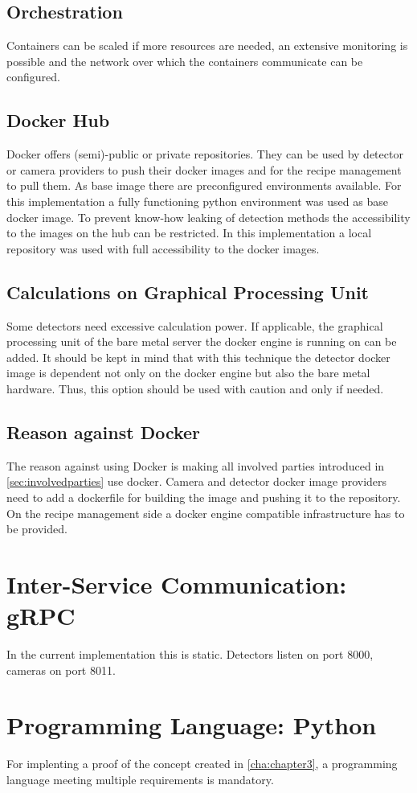 \subsection{Orchestration}
 Containers can be scaled if more resources are needed, an extensive monitoring is possible and the network over which the containers communicate can be configured. 
\subsection{Docker Hub}
 Docker offers (semi)-public or private repositories. They can be used by detector or camera providers to push their docker images and for the recipe management to pull them. As base image there are preconfigured environments available. For this implementation a fully functioning python environment was used as base docker image. To prevent know-how leaking of detection methods the accessibility to the images on the hub can be restricted. In this implementation a local repository was used with full accessibility to the docker images.
 \subsection{Calculations on Graphical Processing Unit}
 Some detectors need excessive calculation power. If applicable, the graphical processing unit of the bare metal server the docker engine is running on can be added. It should be kept in mind that with this technique the detector docker image is dependent not only on the docker engine but also the bare metal hardware. Thus, this option should be used with caution and only if needed.
\subsection{Reason against Docker}
The reason against using Docker is making all involved parties introduced in \ref{sec:involvedparties} use docker. Camera and detector docker image providers need to add a dockerfile for building the image and pushing it to the repository. On the recipe management side a docker engine compatible infrastructure has to be provided. 

\section{Inter-Service Communication: gRPC}
In the current implementation this is static. Detectors listen on port 8000, cameras on port 8011. 
\section{Programming Language: Python}
For implenting a proof of the concept created in \ref{cha:chapter3}, a programming language meeting multiple requirements is mandatory. 

